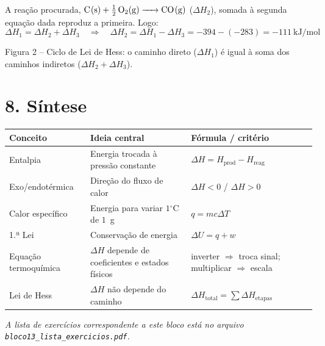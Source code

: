 \documentclass[11pt,a4paper]{article}
\newcommand{\oC}{$^\circ$C}
\begin{document}
A reação procurada, $\ce{C(s) + 1/2 O2(g) -> CO(g)}$ ($\Delta H_2$), somada
à segunda equação dada reproduz a primeira. Logo:
$$\Delta H_1 = \Delta H_2 + \Delta H_3 \quad\Longrightarrow\quad
\Delta H_2 = \Delta H_1 - \Delta H_3 = -394 - (-283) = -111~\text{kJ/mol}$$

\begin{center}


{\small Figura 2 -- Ciclo de Lei de Hess: o caminho direto
($\Delta H_1$) é igual à soma dos caminhos indiretos ($\Delta H_2 + \Delta H_3$).}
\end{center}

\section*{8. Síntese}

\begin{center}
\begin{tabular}{p{3.2cm}p{5.4cm}p{5.6cm}}
\toprule
Conceito & Ideia central & Fórmula / critério \\
\midrule
Entalpia & Energia trocada à pressão constante & $\Delta H = H_{\text{prod}} - H_{\text{reag}}$ \\
Exo/endotérmica & Direção do fluxo de calor & $\Delta H < 0$ / $\Delta H > 0$ \\
Calor específico & Energia para variar $1$\oC{} de $1$~g & $q = mc\Delta T$ \\
1.ª Lei & Conservação de energia & $\Delta U = q + w$ \\
Equação termoquímica & $\Delta H$ depende de coeficientes e estados físicos & inverter $\Rightarrow$ troca sinal; multiplicar $\Rightarrow$ escala \\
Lei de Hess & $\Delta H$ não depende do caminho & $\Delta H_{\text{total}} = \sum \Delta H_{\text{etapas}}$ \\
\bottomrule
\end{tabular}
\end{center}

\bigskip
\noindent\textit{A lista de exercícios correspondente a este bloco está no
arquivo \texttt{bloco13\_lista\_exercicios.pdf}.}
\end{document}
